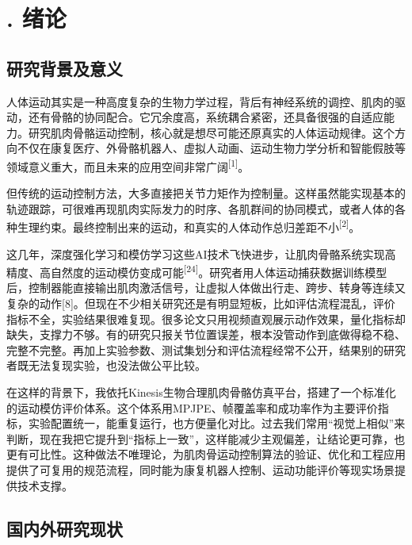 
\chapter{. 绪论}\label{ux7eeaux8bba}

\section{研究背景及意义}\label{ux7814ux7a76ux80ccux666fux53caux610fux4e49}

人体运动其实是一种高度复杂的生物力学过程，背后有神经系统的调控、肌肉的驱动，还有骨骼的协同配合。它冗余度高，系统耦合紧密，还具备很强的自适应能力。研究肌肉骨骼运动控制，核心就是想尽可能还原真实的人体运动规律。这个方向不仅在康复医疗、外骨骼机器人、虚拟人动画、运动生物力学分析和智能假肢等领域意义重大，而且未来的应用空间非常广阔\textsuperscript{[1]}。

但传统的运动控制方法，大多直接把关节力矩作为控制量。这样虽然能实现基本的轨迹跟踪，可很难再现肌肉实际发力的时序、各肌群间的协同模式，或者人体的各种生理约束。最终控制出来的运动，和真实的人体动作总归差距不小\textsuperscript{[2]}。

这几年，深度强化学习和模仿学习这些AI技术飞快进步，让肌肉骨骼系统实现高精度、高自然度的运动模仿变成可能\textsuperscript{[24]}。研究者用人体运动捕获数据训练模型后，控制器能直接输出肌肉激活信号，让虚拟人体做出行走、跨步、转身等连续又复杂的动作[8]。但现在不少相关研究还是有明显短板，比如评估流程混乱，评价指标不全，实验结果很难复现。很多论文只用视频直观展示动作效果，量化指标却缺失，支撑力不够。有的研究只报关节位置误差，根本没管动作到底做得稳不稳、完整不完整。再加上实验参数、测试集划分和评估流程经常不公开，结果别的研究者既无法复现实验，也没法做公平比较。

在这样的背景下，我依托Kinesis生物合理肌肉骨骼仿真平台，搭建了一个标准化的运动模仿评价体系。这个体系用MPJPE、帧覆盖率和成功率作为主要评价指标，实验配置统一，能重复运行，也方便量化对比。过去我们常用“视觉上相似”来判断，现在我把它提升到“指标上一致”，这样能减少主观偏差，让结论更可靠，也更有可比性。这种做法不唯理论，为肌肉骨运动控制算法的验证、优化和工程应用提供了可复用的规范流程，同时能为康复机器人控制、运动功能评价等现实场景提供技术支撑。

\section{国内外研究现状}\label{ux56fdux5185ux5916ux7814ux7a76ux73b0ux72b6}

